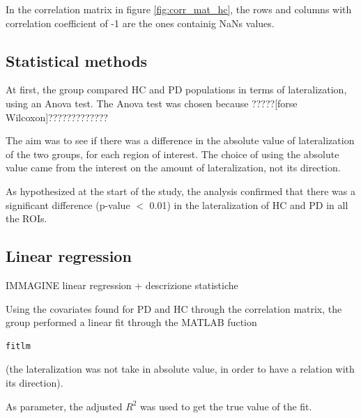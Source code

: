\documentclass[]{article}
\begin{document}
\begin{multicols}{2}

In the correlation matrix in figure \ref{fig:corr_mat_hc}, the rows and columns with correlation coefficient of -1 are the ones containig NaNs values.



\subsection{Statistical methods}

At first, the group compared HC and PD populations in terms of lateralization, using an Anova test. The Anova test was chosen because ?????[forse Wilcoxon]?????????????

The aim was to see if there was a difference in the absolute value of lateralization of the two groups, for each region of interest. The choice of using the absolute value came from the interest on the amount of lateralization, not its direction.

As hypothesized at the start of the study, the analysis confirmed that there was a significant difference (p-value $<$ 0.01) in the lateralization of HC and PD in all the ROIs. 

\subsection{Linear regression}
IMMAGINE linear regression + descrizione statistiche 

Using the covariates found for PD and HC through the correlation matrix, the group performed a linear fit through the MATLAB fuction \begin{verbatim}fitlm \end{verbatim} (the lateralization was not take in absolute value, in order to have a relation with its direction).

As parameter, the adjusted $R^2$ was used to get the true value of the fit.

\end{multicols}
\end{document}
